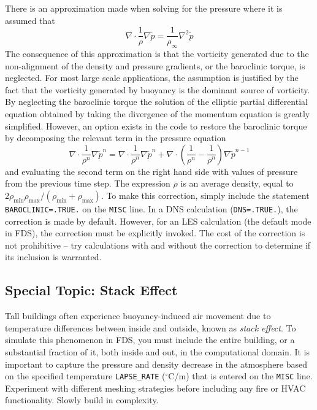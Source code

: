\documentclass[11pt]{book}
\newcommand{\ct}{\tt\small}
\newcommand{\tp}{\tilde{p}}
\newcommand{\be}{\begin{equation}}
\newcommand{\ee}{\end{equation}}
\begin{document}
There is an approximation made when solving for the pressure where it is assumed that
\be \nabla \cdot \frac{1}{\rho} \nabla \tp = \frac{1}{\rho_\infty} \nabla^2 \tp \label{Happrox} \ee
The consequence of this approximation is that the vorticity generated
due to the non-alignment of the density and pressure gradients, or the
baroclinic torque, is neglected. For most large scale applications,
the assumption is justified by the fact that the vorticity generated by
buoyancy is the dominant source of vorticity.
By neglecting the baroclinic torque the
solution of the elliptic partial differential equation obtained by
taking the divergence of the momentum equation is greatly simplified.
However, an option exists in the code to restore the baroclinic torque by
decomposing the relevant term in the pressure equation
\be \nabla \cdot \frac{1}{\rho^n} \nabla \tp^n = \nabla \cdot \frac{1}{\overline{\rho}^n} \nabla \tp^n +
   \nabla \cdot \left( \frac{1}{\rho^n} - \frac{1}{\overline{\rho}^n} \right) \nabla \tp^{n-1}   \ee
and evaluating the second term on the right hand side with values of
pressure from the
previous time step. The expression $\overline{\rho}$ is an average density,
equal to $2 \rho_{\min} \rho_{\max} / (\rho_{\min} + \rho_{\max})$.
To make this correction, simply include the statement {\ct BAROCLINIC=.TRUE.}
on the {\ct MISC} line. In a DNS calculation ({\ct DNS=.TRUE.}), the
correction is made by default. However, for an LES calculation (the default mode in FDS),
the correction must be explicitly invoked. The cost of the
correction is not prohibitive -- try calculations with and without
the correction to determine if its inclusion is warranted.




\subsection{Special Topic: Stack Effect}
\label{info:stackeffect} 

Tall buildings often experience buoyancy-induced air movement due to temperature differences
between inside and outside, known as {\em stack effect}. To simulate this phenomenon in FDS, you must
include the entire building, or a substantial fraction of it, both inside and out, in the computational domain. It
is important to capture the pressure and density decrease in the atmosphere based on the specified
temperature {\ct LAPSE\_RATE} ($^\circ$C/m) that is entered on the {\ct MISC} line. Experiment with different meshing
strategies before including any fire or HVAC  functionality. Slowly build in complexity.
\end{document}
